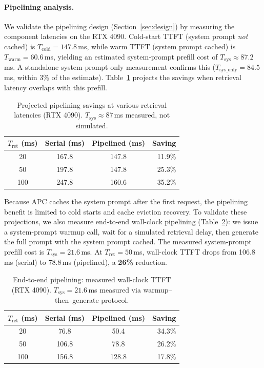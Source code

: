 \documentclass{article}
\begin{document}
\paragraph{Pipelining analysis.}
We validate the pipelining design (Section~\ref{sec:design}) by measuring the component latencies on the RTX 4090. Cold-start TTFT (system prompt \emph{not} cached) is $T_{\text{cold}} = 147.8$\,ms, while warm TTFT (system prompt cached) is $T_{\text{warm}} = 60.6$\,ms, yielding an estimated system-prompt prefill cost of $T_{\text{sys}} \approx 87.2$\,ms. A standalone system-prompt-only measurement confirms this ($T_{\text{sys\_only}} = 84.5$\,ms, within 3\% of the estimate). Table~\ref{tab:pipelining} projects the savings when retrieval latency overlaps with this prefill.

\begin{table}[t]
\caption{Projected pipelining savings at various retrieval latencies (RTX 4090). $T_{\text{sys}} \approx 87$\,ms measured, not simulated.}
\label{tab:pipelining}
\centering
\small
\begin{tabular}{@{}cccr@{}}
\toprule
\textbf{$T_{\text{ret}}$ (ms)} & \textbf{Serial (ms)} & \textbf{Pipelined (ms)} & \textbf{Saving} \\
\midrule
20  & 167.8 & 147.8 & 11.9\% \\
50  & 197.8 & 147.8 & 25.3\% \\
100 & 247.8 & 160.6 & 35.2\% \\
\bottomrule
\end{tabular}
\vspace{-0.5em}
\end{table}

Because APC caches the system prompt after the first request, the pipelining benefit is limited to cold starts and cache eviction recovery. To validate these projections, we also measure end-to-end wall-clock pipelining (Table~\ref{tab:pipelining_e2e}): we issue a system-prompt warmup call, wait for a simulated retrieval delay, then generate the full prompt with the system prompt cached. The measured system-prompt prefill cost is $T_{\text{sys}} = 21.6$\,ms. At $T_{\text{ret}} = 50$\,ms, wall-clock TTFT drops from 106.8\,ms (serial) to 78.8\,ms (pipelined), a \textbf{26\%} reduction.

\begin{table}[t]
\caption{End-to-end pipelining: measured wall-clock TTFT (RTX 4090). $T_{\text{sys}} = 21.6$\,ms measured via warmup--then--generate protocol.}
\label{tab:pipelining_e2e}
\centering
\small
\begin{tabular}{@{}cccr@{}}
\toprule
\textbf{$T_{\text{ret}}$ (ms)} & \textbf{Serial (ms)} & \textbf{Pipelined (ms)} & \textbf{Saving} \\
\midrule
20  & 76.8  & 50.4  & 34.3\% \\
50  & 106.8 & 78.8  & 26.2\% \\
100 & 156.8 & 128.8 & 17.8\% \\
\bottomrule
\end{tabular}
\vspace{-0.5em}
\end{table}
\end{document}
